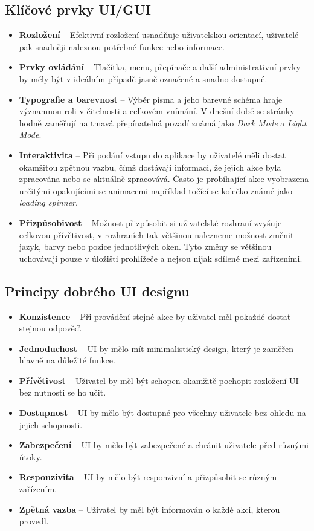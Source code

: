 \subsection*{Klíčové prvky UI/GUI}
\label{subsec:ui-gui-theory-key-elements}
\begin{itemize}
    \item \textbf{Rozložení} -- Efektivní rozložení usnadňuje uživatelskou orientací, uživatelé pak snadněji naleznou potřebné funkce nebo informace.
    \item \textbf{Prvky ovládání} -- Tlačítka, menu, přepínače a další administrativní prvky by měly být v ideálním případě jasně označené a snadno dostupné.
    \item \textbf{Typografie a barevnost} -- Výběr písma a jeho barevné schéma hraje významnou roli v čitelnosti a celkovém vnímání. V dnešní době se stránky hodně zaměřují na tmavá přepínatelná pozadí známá jako \textit{Dark Mode} a \textit{Light Mode}.
    \item \textbf{Interaktivita} -- Při podání vstupu do aplikace by uživatelé měli dostat okamžitou zpětnou vazbu, čímž dostávají informaci, že jejich akce byla zpracována nebo se aktuálně zpracovává. Často je probíhající akce vyobrazena určitými opakujícími se animacemi například točící se kolečko známé jako \textit{loading spinner}.
    \item \textbf{Přizpůsobivost} -- Možnost přizpůsobit si uživatelské rozhraní zvyšuje celkovou přívětivost, v rozhraních tak většinou nalezneme možnost změnit jazyk, barvy nebo pozice jednotlivých oken. Tyto změny se většinou uchovávají pouze v úložišti prohlížeče a nejsou nijak sdílené mezi zařízeními.
\end{itemize}

\subsection*{Principy dobrého UI designu}
\label{subsec:ui-gui-theore-basic-use-case}
\begin{itemize}
    \item \textbf{Konzistence} -- Při provádění stejné akce by uživatel měl pokaždé dostat stejnou odpověď.
    \item \textbf{Jednoduchost} -- UI by mělo mít minimalistický design, který je zaměřen hlavně na důležité funkce.
    \item \textbf{Přívětivost} -- Uživatel by měl být schopen okamžitě pochopit rozložení UI bez nutnosti se ho učit.
    \item \textbf{Dostupnost} -- UI by mělo být dostupné pro všechny uživatele bez ohledu na jejich schopnosti.
    \item \textbf{Zabezpečení} -- UI by mělo být zabezpečené a chránit uživatele před různými útoky.
    \item \textbf{Responzivita} -- UI by mělo být responzivní a přizpůsobit se různým zařízením.
    \item \textbf{Zpětná vazba} -- Uživatel by měl být informován o každé akci, kterou provedl.
\end{itemize}

